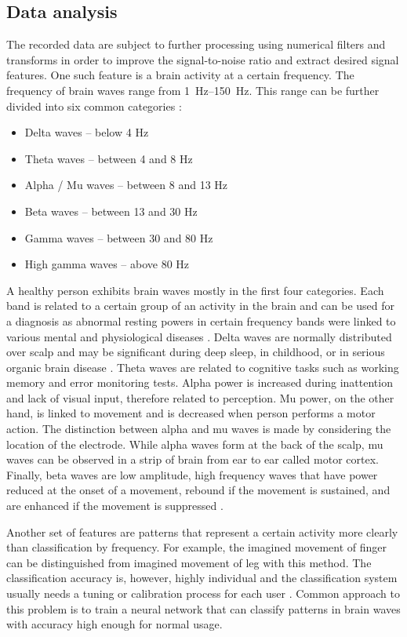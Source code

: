 \subsection{Data analysis} \label{sub:dataAnalysis}
The recorded data are subject to further processing using numerical filters and
transforms in order to improve the signal-to-noise ratio and extract desired signal features. 
One such feature is a brain activity at a certain frequency. The frequency of brain
waves range from \SIrange{1}{150}{\Hz}. This range can be further divided
into six common categories \cite{dominantF}:
\begin{itemize}
  \item Delta waves -- below 4 Hz
  \item Theta waves -- between 4 and 8 Hz
  \item Alpha / Mu waves -- between 8 and 13 Hz
  \item Beta waves -- between 13 and 30 Hz
  \item Gamma waves -- between 30 and 80 Hz
  \item High gamma waves -- above 80 Hz
\end{itemize}
A healthy person exhibits brain waves mostly in the first four categories. Each
band is related to a certain group of an activity in the brain and can be used for
a diagnosis as abnormal resting powers in certain frequency bands were linked to various
mental and physiological diseases \cite{dominantF}. Delta waves are normally
distributed over scalp and may be significant during deep sleep, in childhood, or
in serious organic brain disease \cite{eegClass}. Theta waves are related to
cognitive tasks such as working memory and error monitoring tests. Alpha power
is increased during inattention and lack of visual input, therefore related to
perception. Mu power, on the other hand, is linked to movement and is decreased
when person performs a motor action. The distinction between alpha and mu waves
is made by considering the location of the electrode. While alpha waves form at the
back of the scalp, mu waves can be observed in a strip of brain from ear to ear
called motor cortex. Finally, beta waves are low amplitude, high frequency waves
that have power reduced at the onset of a movement, rebound if the movement is
sustained, and are enhanced if the movement is suppressed \cite{dominantF}.

Another set of features are patterns that represent a certain activity more
clearly than classification by frequency. For example, the imagined movement of
finger can be distinguished from imagined movement of leg with this method. The
classification accuracy is, however, highly individual and the classification
system usually needs a tuning or calibration process for each user \cite{bcComm}.
Common approach to this problem is to train a neural network that can classify
patterns in brain waves with accuracy high enough for normal usage.

